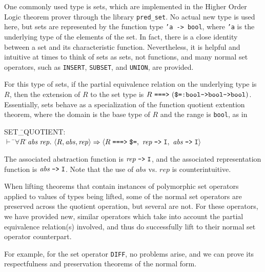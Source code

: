 \documentclass[envcountsame,runningheads]{llncs}
\begin{document}
One commonly used type is sets, which are implemented in the Higher
Order Logic theorem prover through the library {\tt pred\_set}.  No actual
new type is used here, but sets are represented by the function type
{\tt 'a -> bool}, where {\tt 'a} is the underlying type of the elements
of the set.
In fact, there is a close identity between a set and its characteristic
function.  Nevertheless, it is helpful and intuitive at times to think
of sets as sets, not functions, and many normal set operators, such
as {\tt INSERT}, {\tt SUBSET}, and {\tt UNION}, are provided.

For this type of sets,
if the partial equivalence relation
on the underlying type is $R$, then
the extension of $R$
to the set type is
$R \ \mbox{\tt ===>} \ (\mbox{\tt \$=:bool->bool->bool})$.
Essentially, sets behave as a specialization of the
function quotient extention theorem, where the domain is the base type of $R$
and the range is {\tt bool}, as in
{\tt \begin{tabbing}
SET\=\_QUOTIENT: \\
\>  $\vdash$  \=$\forall R\;$\=${\it abs}\;{\it rep}.\ 
          \langle R,{\it abs},{\it rep} \rangle \Rightarrow 
          \langle R\;\mbox{\tt ===>}\;\mbox{\tt \$=},\ 
            {\it rep}\;\mbox{\tt -->}\;{\tt I},\ 
            {\it abs}\;\mbox{\tt -->}\;{\tt I}
          \rangle$ 
\end{tabbing}}
The associated abstraction function
is ${\it rep}\;\mbox{\tt -->}\;{\tt I}$,
and the associated representation function
is ${\it abs}\;\mbox{\tt -->}\;{\tt I}$.
Note that the use of $abs$ vs. $rep$ is counterintuitive.

When lifting theorems that contain instances of polymorphic set operators
applied to values of types being lifted, some of the normal set
operators are preserved across the quotient operation, but several are
not.  For these operators, we have provided new, similar operators
which take into account the partial equivalence relation(s) involved,
and thus do successfully lift to their normal set operator counterpart.

For example, for the set operator {\tt DIFF}, no problems arise, and
we can prove its respectfulness and preservation theorems of the normal
form.
\end{document}
